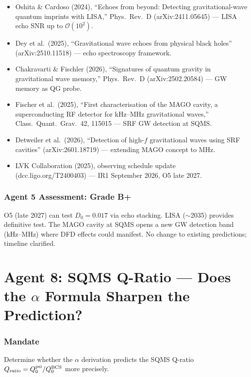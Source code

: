 \documentclass[11pt,a4paper]{article}
\begin{document}
\begin{itemize}
\item Oshita \& Cardoso (2024), ``Echoes from beyond: Detecting gravitational-wave quantum imprints with LISA,'' Phys.\ Rev.\ D (arXiv:2411.05645) --- LISA echo SNR up to $\mathcal{O}(10^2)$.
\item Dey et al.\ (2025), ``Gravitational wave echoes from physical black holes'' (arXiv:2510.11518) --- echo spectroscopy framework.
\item Chakravarti \& Fischler (2026), ``Signatures of quantum gravity in gravitational wave memory,'' Phys.\ Rev.\ D (arXiv:2502.20584) --- GW memory as QG probe.
\item Fischer et al.\ (2025), ``First characterisation of the MAGO cavity, a superconducting RF detector for kHz--MHz gravitational waves,'' Class.\ Quant.\ Grav.\ 42, 115015 --- SRF GW detection at SQMS.
\item Detweiler et al.\ (2026), ``Detection of high-$f$ gravitational waves using SRF cavities'' (arXiv:2601.18719) --- extending MAGO concept to MHz.
\item LVK Collaboration (2025), observing schedule update (dcc.ligo.org/T2400403) --- IR1 September 2026, O5 late 2027.
\end{itemize}

\section{Agent 5 Assessment: Grade B+}

O5 (late 2027) can test $D_0 = 0.017$ via echo stacking. LISA ($\sim$2035) provides definitive test. The MAGO cavity at SQMS opens a new GW detection band (kHz--MHz) where DFD effects could manifest. No change to existing predictions; timeline clarified.


\part{Agent 8: SQMS Q-Ratio --- Does the $\alpha$ Formula Sharpen the Prediction?}
\label{part:agent8}

\section{Mandate}
Determine whether the $\alpha$ derivation predicts the SQMS Q-ratio $Q_{\rm ratio} = Q_0^{\rm psi}/Q_0^{\rm BCS}$ more precisely.
\end{document}
